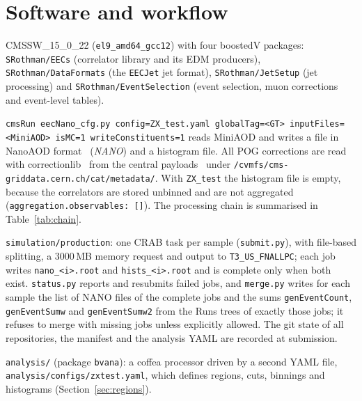 \documentclass[11pt]{article}
\newcommand{\code}[1]{\texttt{#1}}
\begin{document}
\section{Software and workflow}
\label{sec:workflow}

\begin{description}[style=nextline]
\item[Release and packages] CMSSW\_15\_0\_22 (\code{el9\_amd64\_gcc12}) with four boostedV packages:
  \code{SRothman/EECs} (correlator library and its EDM producers), \code{SRothman/DataFormats} (the \code{EECJet}
  jet format), \code{SRothman/JetSetup} (jet processing) and \code{SRothman/EventSelection} (event selection, muon
  corrections and event-level tables).
\item[Job] \code{cmsRun eecNano\_cfg.py config=ZX\_test.yaml globalTag=<GT> inputFiles=<MiniAOD> isMC=1
  writeConstituents=1} reads MiniAOD and writes a file in NanoAOD format~\cite{xpogdocs} (\emph{NANO}) and a histogram file. All POG
  corrections are read with correctionlib~\cite{correctionlib} from the central payloads~\cite{jsonpog} under
  \code{/cvmfs/cms-griddata.cern.ch/cat/metadata/}. With
  \code{ZX\_test} the histogram file is empty, because the correlators are stored unbinned and are not aggregated
  (\code{aggregation.observables: []}). The processing chain is summarised in Table~\ref{tab:chain}.
\item[Production] \code{simulation/production}: one CRAB task per sample (\code{submit.py}), with file-based
  splitting, a 3000\,MB memory request and output to \code{T3\_US\_FNALLPC}; each job writes \code{nano\_<i>.root} and
  \code{hists\_<i>.root} and is complete only when both exist. \code{status.py} reports and resubmits failed jobs, and
  \code{merge.py} writes for each sample the list of NANO files of the complete jobs and the sums \code{genEventCount},
  \code{genEventSumw} and \code{genEventSumw2} from the Runs trees of exactly those jobs; it refuses to merge with
  missing jobs unless explicitly allowed. The git state of all repositories, the manifest and the analysis YAML are
  recorded at submission.
\item[Analysis] \code{analysis/} (package \code{bvana}): a coffea processor driven by a second YAML file,
  \code{analysis/configs/zxtest.yaml}, which defines regions, cuts, binnings and histograms (Section~\ref{sec:regions}).
\end{description}
\end{document}
